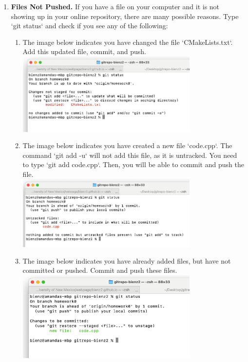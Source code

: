 \documentclass{article} %
\begin{document}
\begin{enumerate}
    \item \textbf{Files Not Pushed.}  If you have a file on your computer and it is not showing up in your online repository, there are many possible reasons.  Type `git status` and check if you see any of the following:

    \begin{enumerate}
        \item The image below indicates you have changed the file `CMakeLists.txt`.  Add this updated file, commit, and push.\\
        \includegraphics[width=0.75\textwidth]{figs/updates.png}

        \item The image below indicates you have created a new file `code.cpp`.  The command `git add -u` will not add this file, as it is untracked.  You need to type `git add code.cpp`.  Then, you will be able to commit and push the file.\\
        \includegraphics[width=0.75\textwidth]{figs/untracked.png}

        \item The image below indicates you have already added files, but have not committed or pushed.  Commit and push these files.\\
        \includegraphics[width=0.75\textwidth]{figs/added.png}


\end{enumerate}
\end{enumerate}
\end{document}
